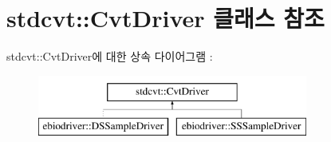 \hypertarget{classstdcvt_1_1CvtDriver}{}\section{stdcvt\+:\+:Cvt\+Driver 클래스 참조}
\label{classstdcvt_1_1CvtDriver}
stdcvt\+:\+:Cvt\+Driver에 대한 상속 다이어그램 \+: \begin{figure}[H]
\begin{center}
\leavevmode
\includegraphics[height=2.000000cm]{classstdcvt_1_1CvtDriver}
\end{center}
\end{figure}
